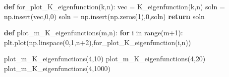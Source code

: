 \documentclass[12pt,]{book}
\newenvironment{Shaded}{}{}
\newcommand{\KeywordTok}[1]{\textcolor[rgb]{0.00,0.44,0.13}{\textbf{{#1}}}}
\newcommand{\DecValTok}[1]{\textcolor[rgb]{0.25,0.63,0.44}{{#1}}}
\newcommand{\ControlFlowTok}[1]{\textcolor[rgb]{0.00,0.44,0.13}{\textbf{{#1}}}}
\newcommand{\OperatorTok}[1]{\textcolor[rgb]{0.40,0.40,0.40}{{#1}}}
\newcommand{\BuiltInTok}[1]{{#1}}
\newcommand{\NormalTok}[1]{{#1}}
\begin{document}
\begin{Shaded}
\begin{Highlighting}[]
\KeywordTok{def} \NormalTok{for_plot_K_eigenfunction(k,n):}
  \NormalTok{vec }\OperatorTok{=} \NormalTok{K_eigenfunction(k,n)}
  \NormalTok{soln }\OperatorTok{=} \NormalTok{np.insert(vec,}\DecValTok{0}\NormalTok{,}\DecValTok{0}\NormalTok{)}
  \NormalTok{soln }\OperatorTok{=} \NormalTok{np.insert(np.zeros(}\DecValTok{1}\NormalTok{),}\DecValTok{0}\NormalTok{,soln)}
  \ControlFlowTok{return} \NormalTok{soln   }
  
\KeywordTok{def} \NormalTok{plot_m_K_eigenfunctions(m,n):}
  \ControlFlowTok{for} \NormalTok{i }\OperatorTok{in} \BuiltInTok{range}\NormalTok{(m}\DecValTok{+1}\NormalTok{):}
  \NormalTok{plt.plot(np.linspace(}\DecValTok{0}\NormalTok{,}\DecValTok{1}\NormalTok{,n}\DecValTok{+2}\NormalTok{),for_plot_K_eigenfunction(i,n))  }

\NormalTok{plot_m_K_eigenfunctions(}\DecValTok{4}\NormalTok{,}\DecValTok{10}\NormalTok{) }
\NormalTok{plot_m_K_eigenfunctions(}\DecValTok{4}\NormalTok{,}\DecValTok{20}\NormalTok{)}
\NormalTok{plot_m_K_eigenfunctions(}\DecValTok{4}\NormalTok{,}\DecValTok{1000}\NormalTok{) }
\end{Highlighting}
\end{Shaded}
\end{document}
